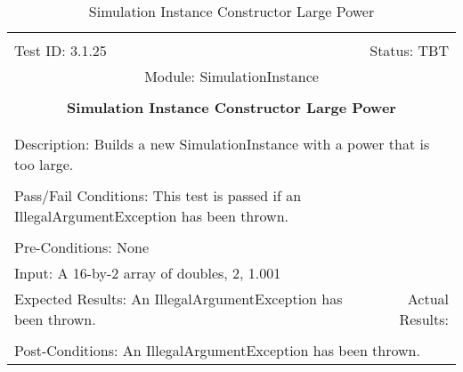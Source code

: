 \documentclass[titlepage]{article}
\begin{document}
\begin{center}%
\begin{table}[h!]
\begin{tabular}{|l r|}\hline&\\[-2mm]
	Test ID: 3.1.25	&Status: TBT\\[-3mm]
	\multicolumn{2}{|c|}{Module: SimulationInstance}\\&\\
	\multicolumn{2}{|c|}{\textbf{\large{Simulation Instance Constructor Large Power}}}\\&\\\hline&\\[-3mm]
	\multicolumn{2}{|p{\textwidth}|}{Description: Builds a new SimulationInstance with a power that is too large.}\\[1mm]\hline&\\[-3mm]
	\multicolumn{2}{|p{\textwidth}|}{Pass/Fail Conditions: This test is passed if an IllegalArgumentException has been thrown.}\\[1mm]\hline&\\[-3mm]
	\multicolumn{2}{|p{\textwidth}|}{Pre-Conditions: None}\\[4mm]
	\multicolumn{2}{|p{\textwidth}|}{Input: A 16-by-2 array of doubles, 2, 1.001}\\[2mm]\hline
	\multicolumn{1}{|p{0.49\textwidth}}{Expected Results: An IllegalArgumentException has been thrown.}	&\multicolumn{1}{|p{0.45\textwidth}|}{Actual Results: }\\\hline&\\[-3mm]
	\multicolumn{2}{|p{\textwidth}|}{Post-Conditions: An IllegalArgumentException has been thrown.}\\\hline
\end{tabular}
\caption{Simulation Instance Constructor Large Power}
\end{table}
\end{center}
\newpage
\end{document}
